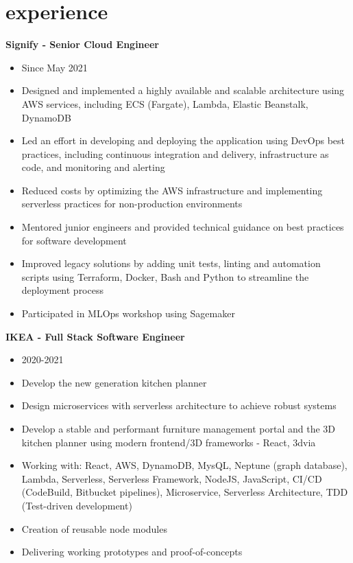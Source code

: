 \documentclass[]{friggeri-cv}
\begin{document}
\section{experience}

\textbf{Signify - Senior Cloud Engineer}
\begin{itemize}
  \item Since May 2021
  \item Designed and implemented a highly available and scalable architecture using AWS services, including ECS (Fargate), Lambda, Elastic Beanstalk, DynamoDB
  \item Led an effort in developing and deploying the application using DevOps best practices, including continuous integration and delivery, infrastructure as code, and monitoring and alerting
  \item Reduced costs by optimizing the AWS infrastructure and implementing serverless practices for non-production environments
  \item Mentored junior engineers and provided technical guidance on best practices for software development
  \item Improved legacy solutions by adding unit tests, linting and automation scripts using Terraform, Docker, Bash and Python to streamline the deployment process
  \item Participated in MLOps workshop using Sagemaker
\end{itemize}

\textbf{IKEA - Full Stack Software Engineer}
\begin{itemize}
  \item 2020-2021
  \item Develop the new generation kitchen planner
  \item Design microservices with serverless architecture to achieve robust systems
  \item Develop a stable and performant furniture management portal and the 3D kitchen planner using modern frontend/3D frameworks - React, 3dvia
  \item Working with: React, AWS, DynamoDB, MysQL, Neptune (graph database), Lambda, Serverless, Serverless Framework, NodeJS, JavaScript, CI/CD (CodeBuild, Bitbucket pipelines), Microservice, Serverless Architecture, TDD (Test-driven development)
  \item Creation of reusable node modules
  \item Delivering working prototypes and proof-of-concepts
\end{itemize}
\end{document}
